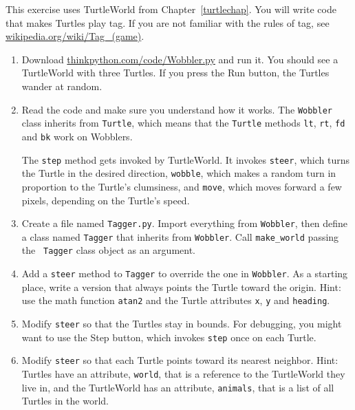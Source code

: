 \begin{exercise}


This exercise uses TurtleWorld from Chapter~\ref{turtlechap}.
You will write code that makes Turtles play tag.  If you
are not familiar with the rules of tag, see
\url{wikipedia.org/wiki/Tag_(game)}.

\begin{enumerate}

\item Download \url{thinkpython.com/code/Wobbler.py} and run it.  You
should see a TurtleWorld with three Turtles.  If you press the
{\sf Run} button, the Turtles wander at random.

\item Read the code and make sure you understand how it works.
The {\tt Wobbler} class inherits from {\tt Turtle}, which means
that the {\tt Turtle} methods {\tt lt}, {\tt rt}, {\tt fd}
and {\tt bk} work on Wobblers.

The {\tt step} method gets invoked by TurtleWorld.  It invokes 
{\tt steer}, which turns the Turtle in the desired direction,
{\tt wobble}, which makes a random turn in proportion to the Turtle's
clumsiness, and {\tt move}, which moves forward a few pixels,
depending on the Turtle's speed.


\item Create a file named {\tt Tagger.py}.  Import everything from
  {\tt Wobbler}, then define a class named {\tt Tagger} that inherits
  from {\tt Wobbler}.  Call \verb"make_world" passing the {\tt
    Tagger} class object as an argument.

\item Add a {\tt steer} method to {\tt Tagger} to override the one in
  {\tt Wobbler}.  As a starting place, write a version that always
  points the Turtle toward the origin.  Hint: use the math function
  {\tt atan2} and the Turtle attributes {\tt x}, {\tt y} and
  {\tt heading}.

\item Modify {\tt steer} so that the Turtles stay in bounds.
  For debugging, you might want to use the {\sf Step} button,
  which invokes {\tt step} once on each Turtle.

\item Modify {\tt steer} so that each Turtle points toward its nearest
  neighbor.  Hint: Turtles have an attribute, {\tt world}, that is a
  reference to the TurtleWorld they live in, and the TurtleWorld has
  an attribute, {\tt animals}, that is a list of all Turtles in the
  world.


\end{enumerate}
\end{exercise}
